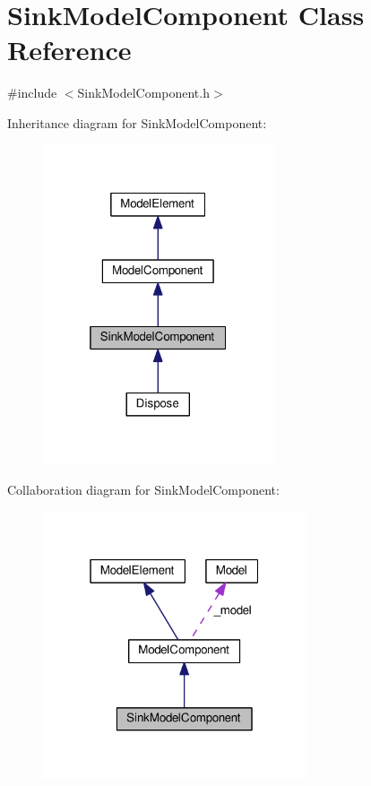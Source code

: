 \hypertarget{class_sink_model_component}{}\section{Sink\+Model\+Component Class Reference}
\label{class_sink_model_component}


{\ttfamily \#include $<$Sink\+Model\+Component.\+h$>$}



Inheritance diagram for Sink\+Model\+Component\+:\nopagebreak
\begin{figure}[H]
\begin{center}
\leavevmode
\includegraphics[width=193pt]{class_sink_model_component__inherit__graph}
\end{center}
\end{figure}


Collaboration diagram for Sink\+Model\+Component\+:\nopagebreak
\begin{figure}[H]
\begin{center}
\leavevmode
\includegraphics[width=220pt]{class_sink_model_component__coll__graph}
\end{center}
\end{figure}
